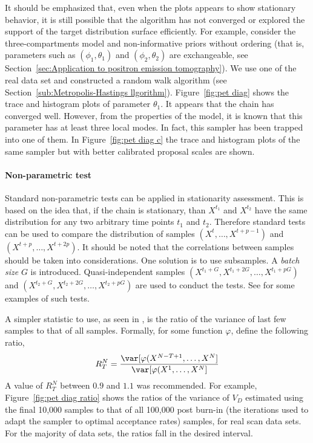 It should be emphasized that, even when the plots appears to show stationary
behavior, it is still possible that the algorithm has not converged or
explored the support of the target distribution surface efficiently. For
example, consider the three-compartments \pet model and non-informative priors
without ordering (that is, parameters such as $(\phi_1,\theta_1)$ and
$(\phi_2,\theta_2)$ are exchangeable, see Section~\ref{sec:Application to
  positron emission tomography}). We use one of the real data set and
constructed a random walk algorithm (see Section~\ref{sub:Metropolis-Hastings
  llgorithm}). Figure~\ref{fig:pet diag} shows the trace and histogram plots
of parameter $\theta_1$. It appears that the \mcmc chain has converged well.
However, from the properties of the model, it is known that this parameter has
at least three local modes. In fact, this sampler has been trapped into one of
them. In Figure~\ref{fig:pet diag c} the trace and histogram plots of the same
sampler but with better calibrated proposal scales are shown.




\paragraph{Non-parametric test}

Standard non-parametric tests can be applied in stationarity assessment. This
is based on the idea that, if the chain is stationary, than $X^{t_1}$ and
$X^{t_2}$ have the same distribution for any two arbitrary time points $t_1$
and $t_2$. Therefore standard tests can be used to compare the distribution of
samples $(X^t,\dots,X^{t+p-1})$ and $(X^{t+p},\dots,X^{t+2p})$. It should be
noted that the correlations between samples should be taken into
considerations. One solution is to use subsamples. A \emph{batch size} $G$ is
introduced. Quasi-independent samples
$(X^{t_1+G},X^{t_1+2G},\dots,X^{t_1+pG})$ and
$(X^{t_2+G},X^{t_2+2G},\dots,X^{t_2+pG})$ are used to conduct the tests. See
\cite[][sec.~12.2.2]{Robert:2004tn} for some examples of such tests.

A simpler statistic to use, as seen in \cite{Gelman:2011vx}, is the ratio of
the variance of last few samples to that of all samples. Formally, for some
function $\varphi$, define the following ratio,
\begin{equation}
  R_T^N = \frac{\var[\varphi(X^{N-T+1},\dots,X^{N}]}
  {\var[\varphi(X^{1},\dots,X^{N}]}
\end{equation}
A value of $R_T^N$ between $0.9$ and $1.1$ was recommended. For example,
Figure~\ref{fig:pet diag ratio} shows the ratios of the variance of $V_D$
estimated using the final 10,000 samples to that of all 100,000 post burn-in
(the iterations used to adapt the sampler to optimal acceptance rates)
samples, for real \pet scan data sets. For the majority of data sets, the
ratios fall in the desired interval.


